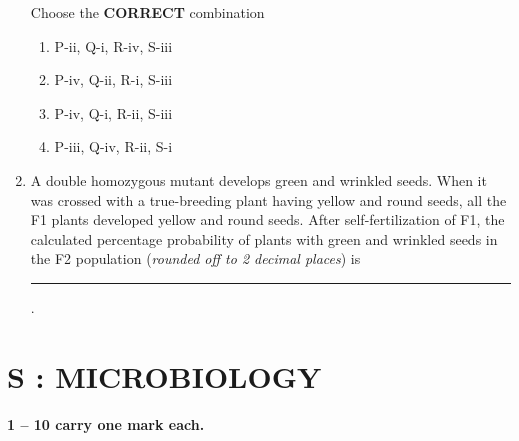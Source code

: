 \documentclass[journal,12pt,onecolumn]{IEEEtran}
\begin{document}
\begin{enumerate}[label=\arabic*.]
Choose the \textbf{CORRECT} combination
\begin{enumerate}[label=(\Alph*)]
\item P-ii, Q-i, R-iv, S-iii
\item P-iv, Q-ii, R-i, S-iii
\item P-iv, Q-i, R-ii, S-iii
\item P-iii, Q-iv, R-ii, S-i
\end{enumerate}

\item A double homozygous mutant develops green and wrinkled seeds. When it was crossed with a true-breeding plant having yellow and round seeds, all the F1 plants developed yellow and round seeds. After self-fertilization of F1, the calculated percentage probability of plants with green and wrinkled seeds in the F2 population (\textit{rounded off to 2 decimal places}) is \rule{3cm}{0.1pt}.

\end{enumerate}
\newpage
\section*{\centering S : MICROBIOLOGY}

\noindent \textbf{1 -- 10 carry one mark each.}
\end{document}
